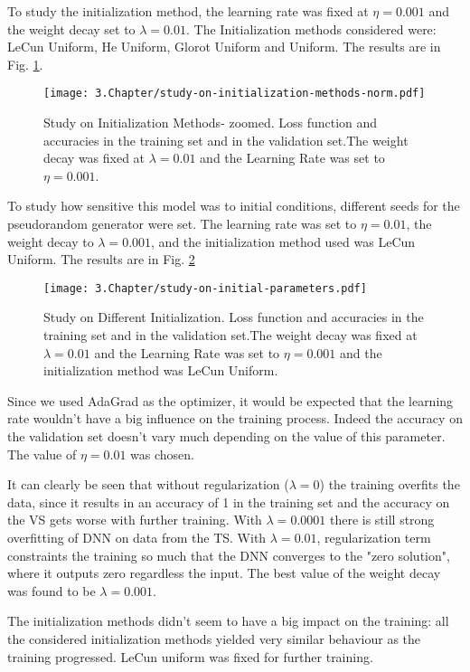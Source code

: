 To study the initialization method, the learning rate was fixed at $\eta = 0.001$ and the weight decay set to $\lambda = 0.01$. The Initialization methods considered were: LeCun Uniform, He Uniform, Glorot Uniform and Uniform. The results are in Fig. \ref{fig:study-InitMethods}.
\begin{figure}[htbp]
	\centering
	\texttt{[image: 3.Chapter/study-on-initialization-methods-norm.pdf]}
	\caption{Study on Initialization Methods- zoomed. Loss function and accuracies in the training set and in the validation set.The weight decay was fixed at $\lambda = 0.01$ and the Learning Rate was set to $\eta = 0.001$.
}
\label{fig:study-InitMethods}
\end{figure}

To study how sensitive this model was to initial conditions, different seeds for the pseudorandom generator were set. The learning rate was set to $\eta = 0.01$, the weight decay to $\lambda = 0.001$, and the initialization method used was LeCun Uniform. The results are in Fig. \ref{fig:study-seeds}

\begin{figure}[htbp]
	\centering
	\texttt{[image: 3.Chapter/study-on-initial-parameters.pdf]}
	\caption{Study on Different Initialization. Loss function and accuracies in the training set and in the validation set.The weight decay was fixed at $\lambda = 0.01$ and the Learning Rate was set to $\eta = 0.001$ and the initialization method was LeCun Uniform.
}
\label{fig:study-seeds}
\end{figure}

Since we used AdaGrad as the optimizer, it would be expected that the learning rate wouldn't have a big influence on the training process. Indeed the accuracy on the validation set doesn't vary much depending on the value of this parameter. The value of $\eta = 0.01$ was chosen.

It can clearly be seen that without regularization ($\lambda = 0$) the training overfits the data, since it results in an accuracy of 1 in the training set and the accuracy on the VS gets worse with further training. With $\lambda = 0.0001$ there is still strong overfitting of DNN on data from the TS. With $\lambda = 0.01$, regularization term constraints the training so much that the DNN converges to the "zero solution", where it outputs zero regardless the input. The best value of the weight decay was found to be $\lambda = 0.001$.

The initialization methods didn't seem to have a big impact on the training: all the considered initialization methods yielded very similar behaviour as the training progressed. LeCun uniform was fixed for further training.

